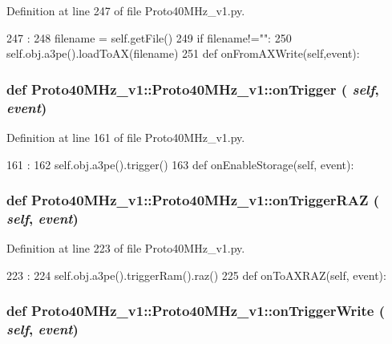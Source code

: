 Definition at line 247 of file Proto40MHz\_\-v1.py.


\begin{DoxyCode}
247                                :
248         filename = self.getFile()
249         if filename!="":
250             self.obj.a3pe().loadToAX(filename)
251 
    def onFromAXWrite(self,event):
\end{DoxyCode}
\hypertarget{classProto40MHz__v1_1_1Proto40MHz__v1_a983e857859f00e9fed6dc1b1613e8901}{
\subsubsection[{onTrigger}]{\setlength{\rightskip}{0pt plus 5cm}def Proto40MHz\_\-v1::Proto40MHz\_\-v1::onTrigger ( {\em self}, \/   {\em event})}}
\label{classProto40MHz__v1_1_1Proto40MHz__v1_a983e857859f00e9fed6dc1b1613e8901}


Definition at line 161 of file Proto40MHz\_\-v1.py.


\begin{DoxyCode}
161                               :
162         self.obj.a3pe().trigger()
163 
    def onEnableStorage(self, event):
\end{DoxyCode}
\hypertarget{classProto40MHz__v1_1_1Proto40MHz__v1_a5ef54a3b8a1ebcb232b17d4bab2d2007}{
\subsubsection[{onTriggerRAZ}]{\setlength{\rightskip}{0pt plus 5cm}def Proto40MHz\_\-v1::Proto40MHz\_\-v1::onTriggerRAZ ( {\em self}, \/   {\em event})}}
\label{classProto40MHz__v1_1_1Proto40MHz__v1_a5ef54a3b8a1ebcb232b17d4bab2d2007}


Definition at line 223 of file Proto40MHz\_\-v1.py.


\begin{DoxyCode}
223                                  :
224         self.obj.a3pe().triggerRam().raz()
225 
    def onToAXRAZ(self, event):
\end{DoxyCode}
\hypertarget{classProto40MHz__v1_1_1Proto40MHz__v1_a5a43adca9aa15ea9ccf555ee622c3b12}{
\subsubsection[{onTriggerWrite}]{\setlength{\rightskip}{0pt plus 5cm}def Proto40MHz\_\-v1::Proto40MHz\_\-v1::onTriggerWrite ( {\em self}, \/   {\em event})}}
\label{classProto40MHz__v1_1_1Proto40MHz__v1_a5a43adca9aa15ea9ccf555ee622c3b12}


